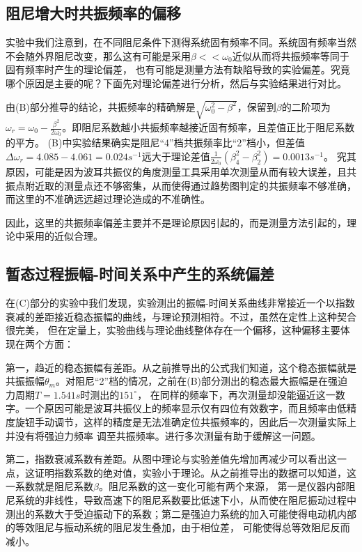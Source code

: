 \documentclass[11pt,a4paper,UTF8]{ctexart}
\begin{document}
\subsection{阻尼增大时共振频率的偏移}

实验中我们注意到，在不同阻尼条件下测得系统固有频率不同。系统固有频率当然不会随外界阻尼改变，那么这有可能是采用$\beta<<\omega_0$近似从而将共振频率等同于固有频率时产生的理论偏差，
也有可能是测量方法有缺陷导致的实验偏差。究竟哪个原因是主要的呢？下面先对理论偏差进行分析，然后与实验结果进行对比。

由(B)部分推导的结论，共振频率的精确解是$\sqrt{\omega_0^2-\beta^2}$，保留到$\beta$的二阶项为$\omega_r=\omega_0-\frac{\beta^2}{2\omega_0}$。即阻尼系数越小共振频率越接近固有频率，且差值正比于阻尼系数的平方。
(B)中实验结果确实是阻尼“4”档共振频率比“2”档小，但差值$\Delta\omega_r=4.085-4.061=0.024s^{-1}$远大于理论差值$\frac{1}{2\omega_0}(\beta_4^2-\beta_2^2)=0.0013s^{-1}$。
究其原因，可能是因为波耳共振仪的角度测量工具采用单次测量从而有较大误差，且共振点附近取的测量点还不够密集，从而使得通过趋势图判定的共振频率不够准确，而这里的不准确远远超过理论造成的不准确性。

因此，这里的共振频率偏差主要并不是理论原因引起的，而是测量方法引起的，理论中采用的近似合理。

\subsection{暂态过程振幅-时间关系中产生的系统偏差}

在(C)部分的实验中我们发现，实验测出的振幅-时间关系曲线非常接近一个以指数衰减的差距接近稳态振幅的曲线，与理论预测相符。不过，虽然在定性上这种契合很完美，
但在定量上，实验曲线与理论曲线整体存在一个偏移，这种偏移主要体现在两个方面：

第一，趋近的稳态振幅有差距。从之前推导出的公式我们知道，这个稳态振幅就是共振振幅$\theta_m$。对阻尼“2”档的情况，之前在(B)部分测出的稳态最大振幅是在强迫力周期$T=1.541s$时测出的$151^{\circ}$，
在同样的频率下，再次测量却没能逼近这一数字。一个原因可能是波耳共振仪上的频率显示仅有四位有效数字，而且频率由低精度旋钮手动调节，这样的精度是无法准确定位共振频率的，因此后一次测量实际上并没有将强迫力频率
调至共振频率。进行多次测量有助于缓解这一问题。

第二，指数衰减系数有差距。从图中理论与实验差值先增加再减少可以看出这一点，这证明指数系数的绝对值，实验小于理论。从之前推导出的数据可以知道，这一系数就是阻尼系数$\beta$。阻尼系数的这一变化可能有两个来源，
第一是仪器内部阻尼系统的非线性，导致高速下的阻尼系数要比低速下小，从而使在阻尼振动过程中测出的系数大于受迫振动下的系数；第二是强迫力系统的加入可能使得电动机内部的等效阻尼与振动系统的阻尼发生叠加，由于相位差，
可能使得总等效阻尼反而减小。
\end{document}
